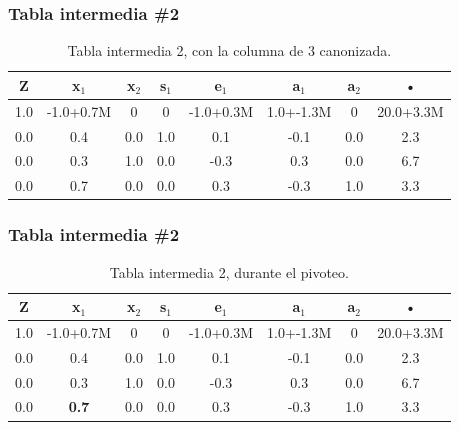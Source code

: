 \documentclass{beamer}
\begin{document}
 
\begin{frame}  
\frametitle{Tabla intermedia \#2} 
\begin{table}[H] 
\begin{center} 
\begin{tabular}{|*{8}{c|}} 
\hline 
\textbf{Z}  & \textbf{x$_{1}$} & \cellcolor{color_columna_candidata}\textcolor{color_blanco}{\textbf{x$_{2}$}} & \textbf{s$_{1}$} & \textbf{e$_{1}$} & \textbf{a$_{1}$} & \textbf{a$_{2}$} & \textbf{•} \\\hline \hline 
1.0 & -1.0+0.7M & \cellcolor{color_columna_candidata}\textcolor{color_blanco}{0} & 0 & -1.0+0.3M & 1.0+-1.3M & 0 & 20.0+3.3M \\\hline 
0.0 & 0.4 & \cellcolor{color_columna_candidata}\textcolor{color_blanco}{0.0} & 1.0 & 0.1 & -0.1 & 0.0 & 2.3\\ 
\hline 
0.0 & 0.3 & \cellcolor{color_columna_candidata}\textcolor{color_blanco}{1.0} & 0.0 & -0.3 & 0.3 & 0.0 & 6.7\\ 
\hline 
0.0 & 0.7 & \cellcolor{color_columna_candidata}\textcolor{color_blanco}{0.0} & 0.0 & 0.3 & -0.3 & 1.0 & 3.3\\ 
\hline 
\end{tabular} 
\caption{Tabla intermedia 2, con la columna de 3 canonizada.} 
\end{center} 
\end{table} 
\end{frame} 
 
 
\begin{frame}  
\frametitle{Tabla intermedia \#2} 
\begin{table}[H] 
\begin{center} 
\begin{tabular}{|*{8}{c|}} 
\hline 
\textbf{Z}  & \cellcolor{color_columna_candidata}\textcolor{color_blanco}{\textbf{x$_{1}$}} & \textbf{x$_{2}$} & \textbf{s$_{1}$} & \textbf{e$_{1}$} & \textbf{a$_{1}$} & \textbf{a$_{2}$} & \textbf{•} \\\hline \hline 
1.0 & \cellcolor{color_columna_candidata}\textcolor{color_blanco}{-1.0+0.7M} & 0 & 0 & -1.0+0.3M & 1.0+-1.3M & 0 & 20.0+3.3M \\\hline 
0.0 & \cellcolor{color_columna_candidata}\textcolor{color_blanco}{0.4} & 0.0 & 1.0 & 0.1 & -0.1 & 0.0 & 2.3\\ 
\hline 
0.0 & \cellcolor{color_columna_candidata}\textcolor{color_blanco}{0.3} & 1.0 & 0.0 & -0.3 & 0.3 & 0.0 & 6.7\\ 
\hline 
0.0 & \cellcolor{color_pivote}\textbf{0.7} & 0.0 & 0.0 & 0.3 & -0.3 & 1.0 & 3.3\\ 
\hline 
\end{tabular} 
\caption{Tabla intermedia 2, durante el pivoteo.} 
\end{center} 
\end{table} 
\end{frame} 
 
\end{document}
